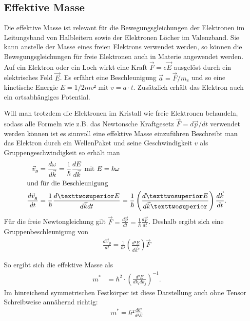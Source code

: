 \subsection{Effektive Masse \cite[][Kap. 14]{book:expi3}}

Die effektive Masse ist relevant für die Bewegungsgleichungen der Elektronen im
Leitungsband von Halbleitern sowie der Elektronen Löcher im Valenzband. Sie
kann anstelle der Masse eines freien Elektrons verwendet werden, so können die
Bewegungsgleichungen für freie Elektronen auch in Materie angewendet werden.
Auf ein Elektron oder ein Loch wirkt eine Kraft $\vec{F} = e \vec{E}$ ausgelöst
durch ein elektrisches Feld $\vec{E}$. Es erfährt eine Beschleunigung $\vec{a}
	= \vec{F}/m_e$ und so eine kinetische Energie $E = 1/2 m v²$ mit $v= a\cdot t$.
Zusätzlich erhält das Elektron auch ein ortsabhängiges Potential.

Will man trotzdem die Elektronen im Kristall wie freie Elektronen behandeln,
sodass alle Formeln wie z.B. das Newtonsche Kraftgesetz $\vec{F} = d\vec{p}/dt$
verwendet werden können ist es sinnvoll eine effektive Masse einzuführen
Beschreibt man das Elektron durch ein WellenPaket und seine Geschwindigkeit $v$
als Gruppengeschwindigkeit so erhält man
\begin{align}
	\vec{v}_g             & = \frac{d\omega}{d\vec{k}} = \frac{1}{\hbar} \frac{dE}{d\vec{k}} \t{ mit } E = \hbar \omega                        \\
	\intertext{und für die Beschleunigung}
	\frac{d\vec{v}_g}{dt} & = \frac{1}{\hbar} \frac{d²E}{d\vec{k} dt} = \frac{1}{\hbar} \left(\frac{d²E}{d\vec{k}²}\right)\frac{d\vec{k}}{dt}.
\end{align}
Für die freie Newtongleichung gilt $\vec{F} = \frac{d\vec{p}}{dt} =\frac{1}{\hbar}\frac{d\vec{p}}{dt} $.
Deshalb ergibt sich eine Gruppenbeschleunigung von
\begin{align}
	\frac{d\vec{v}_g}{dt} = \frac{1}{\hbar²} \left(\frac{d²E}{d\vec{k}²}\right) \vec{F}
\end{align}

So ergibt sich die effektive Masse als
\begin{align}
	m^* & = \hbar^2 \cdot \left(\frac{d²E}{d k_i d k_j}\right)^{-1} .
\end{align}
Im hinreichend symmetrischen Festkörper ist diese Darstellung auch
ohne Tensor Schreibweise annähernd richtig:
\begin{align}
	m^* = \hbar² \frac{dk²}{d²E}
\end{align}

